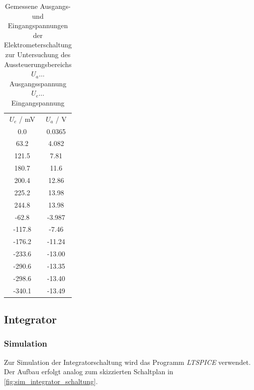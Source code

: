 \documentclass[12pt,english,ngerman]{scrartcl}
\begin{document}
\begin{table}[H]
  \caption{Gemessene Ausgangs- und Eingangspannungen der Elektrometerschaltung
  zur Untersuchung des Aussteuerungsbereichs\\
  $U_a \dots$ Ausgangsspannung \\
  $U_e \dots$ Eingangspannung \\
  }
  \label{tab:mess_elektro_aussteurerung}
  \centering
    \begin{tabular}[c]{S|S}
      {$U_e$ / \si{\milli\volt}} & {$U_a$ / \si{\volt}} \\
      0.0 & 0.0365 \\
      63.2 & 4.082 \\
      121.5 & 7.81 \\
      180.7 & 11.6 \\
      200.4 & 12.86 \\
      225.2 & 13.98 \\
      244.8 & 13.98 \\
      -62.8 & -3.987 \\
      -117.8 & -7.46 \\
      -176.2 & -11.24 \\
      -233.6 & -13.00 \\
      -290.6 & -13.35 \\
      -298.6 & -13.40 \\
      -340.1 & -13.49 \\
    \end{tabular}
\end{table}



\subsection{Integrator}

\subsubsection{Simulation}
Zur Simulation der Integratorschaltung wird das Programm
\textit{LTSPICE} verwendet. Der Aufbau erfolgt analog zum skizzierten
Schaltplan in \autoref{fig:sim_integrator_schaltung}. 
\end{document}
